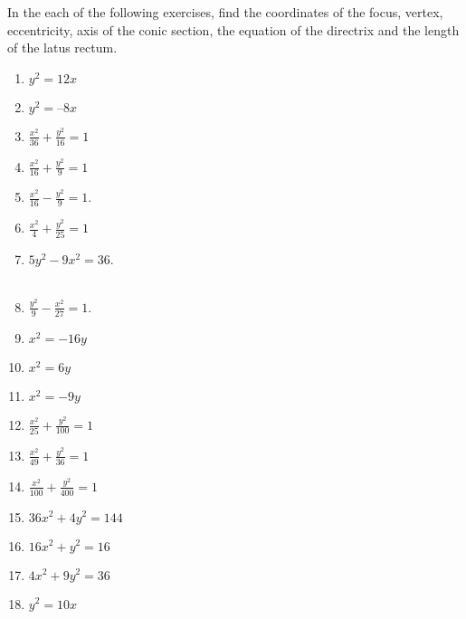 In the each of the following exercises, find the coordinates of the focus, vertex, eccentricity, axis of the conic section, the equation of the directrix and the length of the latus rectum.
\begin{enumerate}[label=\thesubsection.\arabic*,ref=\thesubsection.\theenumi]
\item $y^2=12x$ 
\label{chapters/11/11/2/1}
\\
\solution

\item 
$y^2 = –8x$
  \item $\frac{x^2}{36}+\frac{y^2}{16}=1$
\\
\solution

  \item $\frac{x^2}{16}+\frac{y^2}{9}=1$
	\item $\frac{x^2}{16}-\frac{y^2}{9} = 1$. \\ 
		\solution
		
\begin{table}[H]
\centering
\caption{}
\label{tab:std-conic-params-sol}
\resizebox{\columnwidth}{!}{%
		
		}
\end{table}
  \item $\frac{x^2}{4}+\frac{y^2}{25}=1$
\\
\solution

	\item $5{y^2}-9{x^2}=36$.
		\\
		\solution
		\\
		
	\item $\frac{y^2}{9}-\frac{x^2}{27}=1$.
\item $x^2=-16y$
\\
\solution

\item $x^2=6y$ 
\begin{table}[H]
\centering
\caption{}
\label{tab:rot-conic-params-sol}
\resizebox{\columnwidth}{!}{%
		
		}
\end{table}
\item $x^2=-9y$  
  \item $\frac{x^2}{25}+\frac{y^2}{100}=1$
  \item $\frac{x^2}{49}+\frac{y^2}{36}=1$
  \item $\frac{x^2}{100}+\frac{y^2}{400}=1$
  \item $36x^2+4y^2=144$
  \item $16x^2+y^2=16$
  \item $4x^2+9y^2=36$
\item $y^2=10x$  
\end{enumerate}

